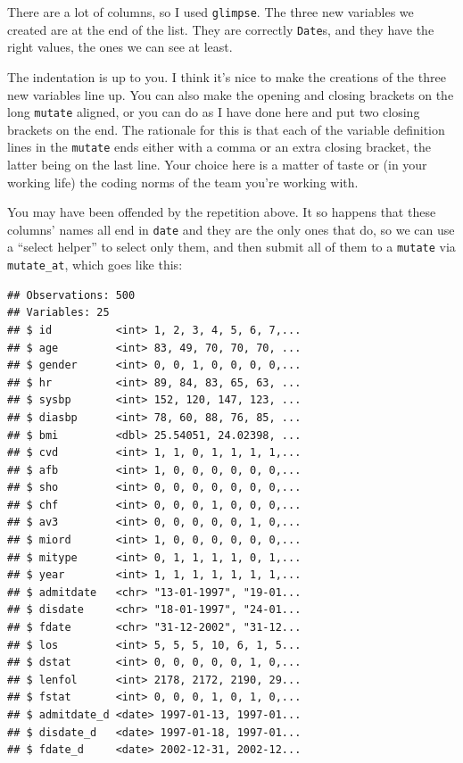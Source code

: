 \documentclass[]{tufte-book}
\newenvironment{Shaded}{}{}
\newcommand{\DataTypeTok}[1]{\textcolor[rgb]{0.56,0.13,0.00}{#1}}
\newcommand{\KeywordTok}[1]{\textcolor[rgb]{0.00,0.44,0.13}{\textbf{#1}}}
\newcommand{\NormalTok}[1]{#1}
\newcommand{\OperatorTok}[1]{\textcolor[rgb]{0.40,0.40,0.40}{#1}}
\newcommand{\StringTok}[1]{\textcolor[rgb]{0.25,0.44,0.63}{#1}}
\theoremstyle{definition}
\theoremstyle{definition}
\theoremstyle{definition}
\theoremstyle{remark}
\begin{document}
There are a lot of columns, so I used \texttt{glimpse}. The three new
variables we created are at the end of the list. They are correctly
\texttt{Date}s, and they have the right values, the ones we can see at
least.

The indentation is up to you. I think it's nice to make the creations of
the three new variables line up. You can also make the opening and
closing brackets on the long \texttt{mutate} aligned, or you can do as I
have done here and put two closing brackets on the end. The rationale
for this is that each of the variable definition lines in the
\texttt{mutate} ends either with a comma or an extra closing bracket,
the latter being on the last line. Your choice here is a matter of taste
or (in your working life) the coding norms of the team you're working
with.

You may have been offended by the repetition above. It so happens that
these columns' names all end in \texttt{date} and they are the only ones
that do, so we can use a ``select helper'' to select only them, and then
submit all of them to a \texttt{mutate} via \texttt{mutate\_at}, which
goes like this:

\begin{Shaded}
\end{Shaded}

\begin{verbatim}
## Observations: 500
## Variables: 25
## $ id          <int> 1, 2, 3, 4, 5, 6, 7,...
## $ age         <int> 83, 49, 70, 70, 70, ...
## $ gender      <int> 0, 0, 1, 0, 0, 0, 0,...
## $ hr          <int> 89, 84, 83, 65, 63, ...
## $ sysbp       <int> 152, 120, 147, 123, ...
## $ diasbp      <int> 78, 60, 88, 76, 85, ...
## $ bmi         <dbl> 25.54051, 24.02398, ...
## $ cvd         <int> 1, 1, 0, 1, 1, 1, 1,...
## $ afb         <int> 1, 0, 0, 0, 0, 0, 0,...
## $ sho         <int> 0, 0, 0, 0, 0, 0, 0,...
## $ chf         <int> 0, 0, 0, 1, 0, 0, 0,...
## $ av3         <int> 0, 0, 0, 0, 0, 1, 0,...
## $ miord       <int> 1, 0, 0, 0, 0, 0, 0,...
## $ mitype      <int> 0, 1, 1, 1, 1, 0, 1,...
## $ year        <int> 1, 1, 1, 1, 1, 1, 1,...
## $ admitdate   <chr> "13-01-1997", "19-01...
## $ disdate     <chr> "18-01-1997", "24-01...
## $ fdate       <chr> "31-12-2002", "31-12...
## $ los         <int> 5, 5, 5, 10, 6, 1, 5...
## $ dstat       <int> 0, 0, 0, 0, 0, 1, 0,...
## $ lenfol      <int> 2178, 2172, 2190, 29...
## $ fstat       <int> 0, 0, 0, 1, 0, 1, 0,...
## $ admitdate_d <date> 1997-01-13, 1997-01...
## $ disdate_d   <date> 1997-01-18, 1997-01...
## $ fdate_d     <date> 2002-12-31, 2002-12...
\end{verbatim}
\end{document}
